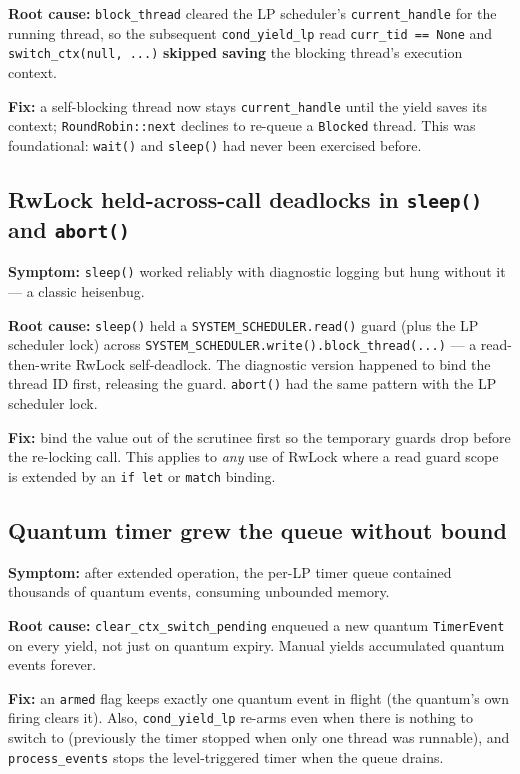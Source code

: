 \textbf{Root cause:} \texttt{block\_thread} cleared the LP scheduler's
\texttt{current\_handle} for the running thread, so the subsequent
\texttt{cond\_yield\_lp} read \texttt{curr\_tid == None} and
\texttt{switch\_ctx(null, ...)} \textbf{skipped saving} the blocking thread's
execution context.

\textbf{Fix:} a self-blocking thread now stays \texttt{current\_handle} until
the yield saves its context; \texttt{RoundRobin::next} declines to re-queue a
\texttt{Blocked} thread. This was foundational: \texttt{wait()} and
\texttt{sleep()} had never been exercised before.

\subsection{RwLock held-across-call deadlocks in \texttt{sleep()} and
\texttt{abort()}}

\textbf{Symptom:} \texttt{sleep()} worked reliably with diagnostic logging but
hung without it --- a classic heisenbug.

\textbf{Root cause:} \texttt{sleep()} held a \texttt{SYSTEM\_SCHEDULER.read()}
guard (plus the LP scheduler lock) across
\texttt{SYSTEM\_SCHEDULER.write().block\_thread(...)} --- a read-then-write
RwLock self-deadlock. The diagnostic version happened to bind the thread ID
first, releasing the guard. \texttt{abort()} had the same pattern with the LP
scheduler lock.

\textbf{Fix:} bind the value out of the scrutinee first so the temporary
guards drop before the re-locking call. This applies to \emph{any} use of
RwLock where a read guard scope is extended by an \texttt{if let} or
\texttt{match} binding.

\subsection{Quantum timer grew the queue without bound}

\textbf{Symptom:} after extended operation, the per-LP timer queue contained
thousands of quantum events, consuming unbounded memory.

\textbf{Root cause:} \texttt{clear\_ctx\_switch\_pending} enqueued a new
quantum \texttt{TimerEvent} on every yield, not just on quantum expiry. Manual
yields accumulated quantum events forever.

\textbf{Fix:} an \texttt{armed} flag keeps exactly one quantum event in flight
(the quantum's own firing clears it). Also, \texttt{cond\_yield\_lp} re-arms
even when there is nothing to switch to (previously the timer stopped when only
one thread was runnable), and \texttt{process\_events} stops the
level-triggered timer when the queue drains.

